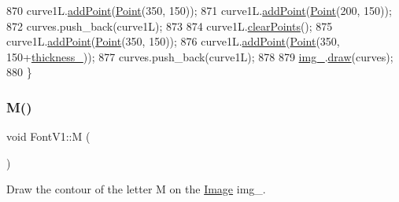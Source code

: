 \begin{DoxyCode}
870     curve1L.\mbox{\hyperlink{class_bezier_curve_a38d16c18b36ae45619b05e26e226cf34}{addPoint}}(\mbox{\hyperlink{class_point}{Point}}(350, 150));
871     curve1L.\mbox{\hyperlink{class_bezier_curve_a38d16c18b36ae45619b05e26e226cf34}{addPoint}}(\mbox{\hyperlink{class_point}{Point}}(200, 150));
872     curves.push\_back(curve1L);
873 
874     curve1L.\mbox{\hyperlink{class_bezier_curve_a0ba8ce66d5af5971ae6a1b506029728e}{clearPoints}}();
875     curve1L.\mbox{\hyperlink{class_bezier_curve_a38d16c18b36ae45619b05e26e226cf34}{addPoint}}(\mbox{\hyperlink{class_point}{Point}}(350, 150));
876     curve1L.\mbox{\hyperlink{class_bezier_curve_a38d16c18b36ae45619b05e26e226cf34}{addPoint}}(\mbox{\hyperlink{class_point}{Point}}(350, 150+\mbox{\hyperlink{class_font_v1_aed8040e76be9a52833627b92f0fb4e5f}{thickness\_}}));
877     curves.push\_back(curve1L);
878 
879     \mbox{\hyperlink{class_font_v1_a00569e3e3c4b70f437b63f396f735fb0}{img\_}}.\mbox{\hyperlink{class_image_a8d162f3cab956131d58708c09aa560b0}{draw}}(curves);
880 \}
\end{DoxyCode}
\mbox{\label{class_font_v1_a69afdf545ed6bccbb31efaef5d6d4219}} 
\subsubsection{\texorpdfstring{M()}{M()}}
{\footnotesize\ttfamily void Font\+V1\+::M (\begin{DoxyParamCaption}{ }\end{DoxyParamCaption})}



Draw the contour of the letter M on the \mbox{\hyperlink{class_image}{Image}} img\+\_\+. 


